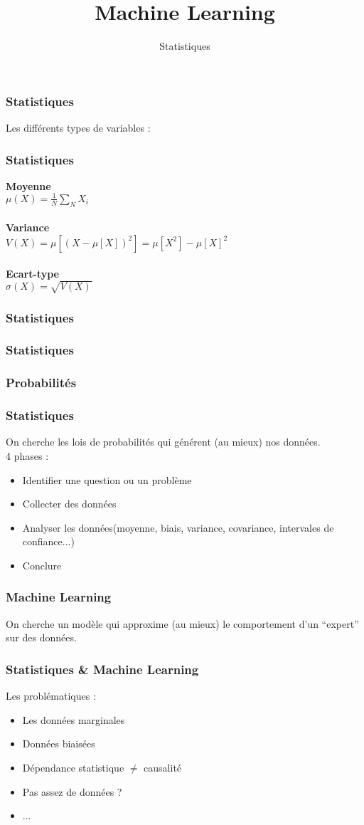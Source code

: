 \documentclass{formation}
\title{Machine Learning}
\subtitle{Statistiques}
\begin{document}
\begin{frame}
  \frametitle{Statistiques}
  Les différents types de variables :
\end{frame}

\begin{frame}
  \frametitle{Statistiques}
  \textbf{Moyenne}\\
  $\mu(X) = \frac{1}{N}\sum_{N}X_i$ \\ \\
  \textbf{Variance}\\
  $V(X)={\mu \left[\left(X-\mu [X]\right)^{2}\right]}=\mu[X^{2}]-\mu[X]^{2}$ \\ \\
  \textbf{Ecart-type}\\
  $\sigma(X)=\sqrt{V(X)}$
\end{frame}

\begin{frame}
  \frametitle{Statistiques}
\end{frame}

\begin{frame}
  \frametitle{Statistiques}
\end{frame}

\begin{frame}
  \frametitle{Probabilités}
\end{frame}


\begin{frame}
  \frametitle{Statistiques}
  On cherche les lois de probabilités qui générent (au mieux) nos données.\\
  4 phases :
  \begin{itemize}
  \item Identifier une question ou un problème
  \item Collecter des données
  \item Analyser les données(moyenne, biais, variance, covariance, intervales de confiance...)
  \item Conclure
  \end{itemize}
\end{frame}

\begin{frame}
  \frametitle{Machine Learning}
  On cherche un modèle qui approxime (au mieux) le comportement d'un ``expert'' sur des données.\\
\end{frame}

\begin{frame}
  \frametitle{Statistiques \& Machine Learning}
  Les problématiques :
  \begin{itemize}
  \item Les données marginales
  \item Données biaisées
  \item Dépendance statistique $\neq$ causalité 
  \item Pas assez de données ?
  \item ...
  \end{itemize}
\end{frame}
\end{document}
